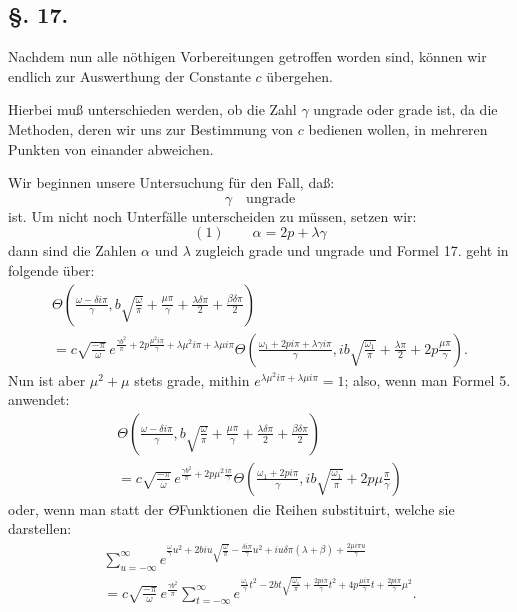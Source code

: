 \documentclass[10pt]{article}
\newcommand{\sourceanchor}[1]{\hypertarget{source-#1}{}}
\begin{document}
\sourceanchor{PA13}
\subsection*{\S. 17.}
Nachdem nun alle nöthigen Vorbereitungen getroffen worden sind, können wir endlich zur Auswerthung der Constante \(c\) übergehen.

Hierbei muß unterschieden werden, ob die Zahl \(\gamma\) ungrade oder grade ist, da die Methoden, deren wir uns zur Bestimmung von \(c\) bedienen wollen, in mehreren Punkten von einander abweichen.

Wir beginnen unsere Untersuchung für den Fall, daß:
\[
\gamma\quad\text{ungrade}
\]
ist. Um nicht noch Unterfälle unterscheiden zu müssen, setzen wir:
\[
(1)\qquad \alpha=2p+\lambda\gamma
\]
dann sind die Zahlen \(\alpha\) und \(\lambda\) zugleich grade und ungrade und Formel 17. geht in folgende über:
\begin{multline*}
\Theta\!\left(\frac{\omega-\delta i\pi}{\gamma},
 b\sqrt{\frac{\omega}{\pi}}+\frac{\mu\pi}{\gamma}+\frac{\lambda\delta\pi}{2}+\frac{\beta\delta\pi}{2}\right)\\
=c\sqrt{\frac{-\pi}{\omega}}\,e^{\frac{\gamma b^{2}}{\pi}+2p\frac{\mu^{2}i\pi}{\gamma}+\lambda\mu^{2}i\pi+\lambda\mu i\pi}
\Theta\!\left(\frac{\omega_{1}+2p i\pi+\lambda\gamma i\pi}{\gamma},
 ib\sqrt{\frac{\omega_{1}}{\pi}}+\frac{\lambda\pi}{2}+2p\frac{\mu\pi}{\gamma}\right).
\end{multline*}
Nun ist aber \(\mu^{2}+\mu\) stets grade, mithin
\(e^{\lambda\mu^{2}i\pi+\lambda\mu i\pi}=1\); also, wenn man Formel 5. anwendet:
\begin{multline*}
\Theta\!\left(\frac{\omega-\delta i\pi}{\gamma},
 b\sqrt{\frac{\omega}{\pi}}+\frac{\mu\pi}{\gamma}+\frac{\lambda\delta\pi}{2}+\frac{\beta\delta\pi}{2}\right)\\
=c\sqrt{\frac{-\pi}{\omega}}\,e^{\frac{\gamma b^{2}}{\pi}+2p\mu^{2}\frac{i\pi}{\gamma}}
\Theta\!\left(\frac{\omega_{1}+2p i\pi}{\gamma},
 ib\sqrt{\frac{\omega_{1}}{\pi}}+2p\mu\frac{\pi}{\gamma}\right)
\end{multline*}
oder, wenn man statt der \(\Theta\)Funktionen die Reihen substituirt, welche sie darstellen:
\begin{multline*}
\sum_{u=-\infty}^{\infty}
 e^{\frac{\omega}{\gamma}u^{2}+2biu\sqrt{\frac{\omega}{\pi}}-\frac{\delta i\pi}{\gamma}u^{2}+iu\delta\pi(\lambda+\beta)+\frac{2\mu i\pi u}{\gamma}}\\
=c\sqrt{\frac{-\pi}{\omega}}\,e^{\frac{\gamma b^{2}}{\pi}}
\sum_{t=-\infty}^{\infty}
 e^{\frac{\omega_{1}}{\gamma}t^{2}-2bt\sqrt{\frac{\omega_{1}}{\pi}}+\frac{2p i\pi}{\gamma}t^{2}+4p\frac{\mu i\pi}{\gamma}t+\frac{2p i\pi}{\gamma}\mu^{2}}.
\end{multline*}
\end{document}
